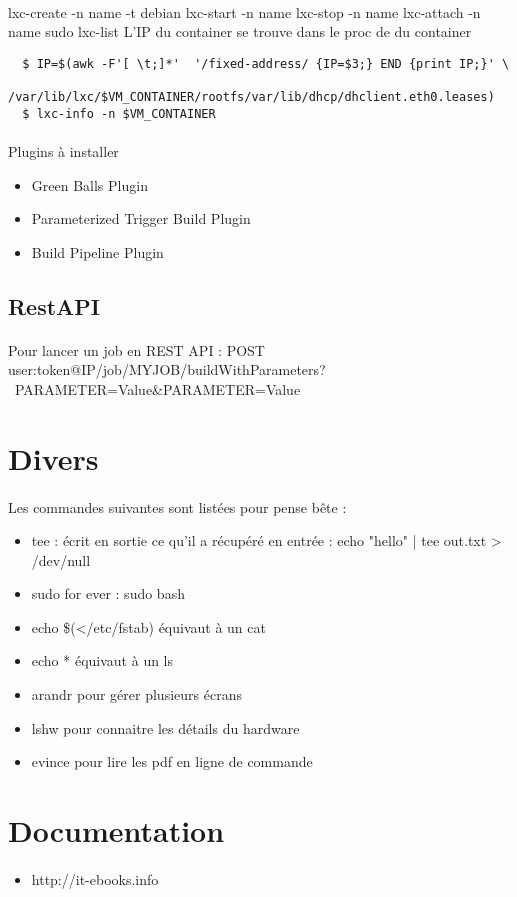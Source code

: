 \documentclass{article}
\begin{document}
\paragraph{}
lxc-create -n name -t debian
lxc-start -n name
lxc-stop -n name
lxc-attach -n name
sudo lxc-list
L'IP du container se trouve dans le proc de du container
\begin{verbatim}
  $ IP=$(awk -F'[ \t;]*'  '/fixed-address/ {IP=$3;} END {print IP;}' \
		 /var/lib/lxc/$VM_CONTAINER/rootfs/var/lib/dhcp/dhclient.eth0.leases)
  $ lxc-info -n $VM_CONTAINER
\end{verbatim}


\paragraph{}
Plugins à installer
\begin{itemize}
  \item Green Balls Plugin
  \item Parameterized Trigger Build Plugin 
  \item Build Pipeline Plugin
\end{itemize}

\subsection{RestAPI}
\paragraph{}
Pour lancer un job en REST API :  POST user:token@IP/job/MYJOB/buildWithParameters? \ 
   PARAMETER=Value\&PARAMETER=Value

\section{Divers}\label{divers}
\paragraph{}
Les commandes suivantes sont listées pour pense bête :
\begin{itemize}
  \item tee : écrit en sortie ce qu'il a récupéré en entrée : echo "hello" | tee out.txt > /dev/null
  \item sudo for ever : sudo bash
  \item echo \$(</etc/fstab) équivaut à un cat
  \item echo * équivaut à un ls
  \item arandr pour gérer plusieurs écrans
  \item lshw pour connaitre les détails du hardware
  \item evince pour lire les pdf en ligne de commande
\end{itemize}

\section{Documentation}\label{documentation}
\paragraph{}
\begin{itemize}
  \item http://it-ebooks.info
\end{itemize}
\end{document}
